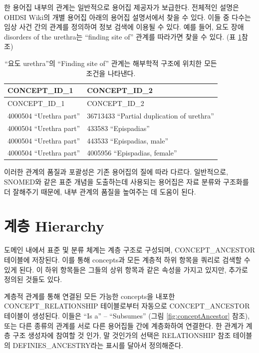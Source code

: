 \documentclass[11pt]{book}
\theoremstyle{definition}
\theoremstyle{definition}
\theoremstyle{definition}
\theoremstyle{remark}
\begin{document}
한 용어집 내부의 관계는 일반적으로 용어집 제공자가 보급한다. 전체적인
설명은 OHDSI Wiki의 개별 용어집 아래의 용어집 설명서에서 찾을 수 있다.
이들 중 다수는 임상 사건 간의 관계를 정의하여 정보 검색에 이용될 수
있다. 예를 들어, 요도 장애 disorders of the urethra는 ``finding site
of'' 관계를 따라가면 찾을 수 있다. (표 \ref{tab:findingSite}참조)

\begin{longtable}[]{@{}ll@{}}
\caption{\label{tab:findingSite} ``요도 urethra''의 ``Finding site of''
관계는 해부학적 구조에 위치한 모든 조건을 나타낸다.}\tabularnewline
\toprule
CONCEPT\_ID\_1 & CONCEPT\_ID\_2\tabularnewline
\midrule
\endfirsthead
\toprule
CONCEPT\_ID\_1 & CONCEPT\_ID\_2\tabularnewline
\midrule
\endhead
4000504 ``Urethra part'' & 36713433 ``Partial duplication of
urethra''\tabularnewline
4000504 ``Urethra part'' & 433583 ``Epispadias''\tabularnewline
4000504 ``Urethra part'' & 443533 ``Epispadias, male''\tabularnewline
4000504 ``Urethra part'' & 4005956 ``Epispadias, female''\tabularnewline
\bottomrule
\end{longtable}

이러한 관계의 품질과 포괄성은 기존 용어집의 질에 따라 다르다.
일반적으로, SNOMED와 같은 표준 개념을 도출하는데 사용되는 용어집은 자료
분류와 구조화를 더 잘해주기 때문에, 내부 관계의 품질을 높여주는 데
도움이 된다.

\section{계층 Hierarchy}\label{conceptAncestor}

도메인 내에서 표준 및 분류 체계는 계층 구조로 구성되며,
CONCEPT\_ANCESTOR 테이블에 저장된다. 이를 통해 concepts과 모든 계층적
하위 항목을 쿼리로 검색할 수 있게 된다. 이 하위 항목들은 그들의 상위
항목과 같은 속성을 가지고 있지만, 추가로 정의된 것들도 있다.

계층적 관계를 통해 연결된 모든 가능한 concepts을 내포한
CONCEPT\_RELATIONSHIP 테이블로부터 자동으로 CONCEPT\_ANCESTOR 테이블이
생성된다. 이들은 ``Is a'' -- ``Subsumes'' (그림
\ref{fig:conceptAncestor} 참조), 또는 다른 종류의 관계를 서로 다른
용어집들 간에 계층화하여 연결한다. 한 관계가 계층 구조 생성자에 참여할
것 인가, 말 것인가의 선택은 RELATIONSHIP 참조 테이블의
DEFINIES\_ANCESTRY라는 표시를 달아서 정의해준다.
\end{document}
